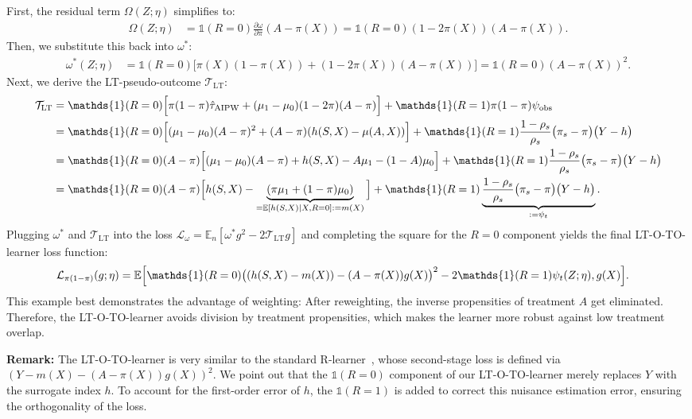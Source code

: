 \documentclass{article}
\theoremstyle{plain}
\theoremstyle{definition}
\theoremstyle{remark}
\newcommand{\E}{\mathbb{E}}                %
\newcommand{\1}{\mathds{1}}                %
\newcommand{\TO}{LT-O-TO-learner\xspace}
\begin{document}
First, the residual term $\Omega(Z;\eta)$ simplifies to:
\begin{align}
    \Omega(Z;\eta) &= \1(R=0)\frac{\partial \omega}{\partial \pi}(A-\pi(X)) = \1(R=0)(1-2\pi(X))(A-\pi(X)).
\end{align}
%
Then, we substitute this back into $\omega^*$:
\begin{align}
\omega^*(Z;\eta) &= \1(R=0)\big[\pi(X)(1-\pi(X)) + (1-2\pi(X))(A-\pi(X))\big] = \1(R=0)(A-\pi(X))^2.
\end{align}
%
Next, we derive the LT-pseudo-outcome $\mathcal{T}_\mathrm{LT}$:
\begin{align}
\mathcal{T}_\mathrm{LT} &= \1(R=0)\Big[ \pi(1-\pi)\hat{\tau}_\mathrm{AIPW} + (\mu_1-\mu_0)(1-2\pi)(A-\pi) \Big] + \1(R=1)\pi(1-\pi)\psi_\mathrm{obs} \notag \\
&= \1(R=0)\Big[ (\mu_1-\mu_0)(A-\pi)^2 + (A-\pi)(h(S,X)-\mu(A, X)) \Big] + \1(R=1)\frac{1-\rho_s}{\rho_s}\big(\pi_s-\pi\big)\big(Y-h\big) \notag \\
&=\1(R=0) (A-\pi)\Big[ (\mu_1-\mu_0)(A-\pi) + h(S,X)- A\mu_1-(1-A)\mu_0 \Big] + \1(R=1)\frac{1-\rho_s}{\rho_s}\big(\pi_s-\pi\big)\big(Y-h\big)\notag \\
&= \1(R=0) (A-\pi)\Big[ h(S,X)- \underbrace{(\pi\mu_1 + (1-\pi)\mu_0)}_{=\E[h(S,X)\mid X,R=0]:=m(X)} \Big] + \1(R=1)\underbrace{\frac{1-\rho_s}{\rho_s}\big(\pi_s-\pi\big)\big(Y-h\big)}_{:=\psi_t}.
\end{align}
%
Plugging $\omega^*$ and $\mathcal{T}_\mathrm{LT}$ into the loss $\mathcal{L}_\omega = \mathbb{E}_n [\omega^* g^2 - 2\mathcal{T}_\mathrm{LT} g]$ and completing the square for the $R=0$ component yields the final \TO loss function:
\begin{align}
& \mathcal{L}_{\pi(1-\pi)}(g;\eta)=\mathbb{E}\Bigl[ \1(R=0)\bigl((h(S,X)-m(X))-(A -\pi(X))g(X)\bigr)^2 - 2\1(R=1)\psi_{t}(Z;\eta),g(X)\Bigr].
\end{align}
This example best demonstrates the advantage of weighting: After reweighting, the inverse propensities of treatment $A$ get eliminated. Therefore, the \TO avoids division by treatment propensities, which makes the learner more robust against low treatment overlap. 

\textbf{Remark:} The \TO is very similar to the standard R-learner~\citep{Nie.2021}, whose second-stage loss is defined via $(Y-m(X) - (A-\pi(X))g(X))^2$. We point out that the $\1(R=0)$ component of our \TO merely replaces $Y$ with the surrogate index $h$. To account for the first-order error of $h$, the $\1(R=1)$ is added to correct this nuisance estimation error, ensuring the orthogonality of the loss.
\end{document}
